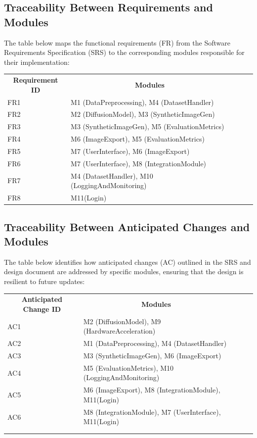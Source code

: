 \documentclass[12pt, titlepage]{article}
\begin{document}
\subsection{Traceability Between Requirements and Modules}
The table below maps the functional requirements (FR) from the Software Requirements Specification (SRS) to the corresponding modules responsible for their implementation:
\begin{table}[H]
  \begin{tabular}{lllll}
  \multicolumn{1}{c}{\textbf{Requirement ID}} & \multicolumn{1}{c}{\textbf{Modules}} &  &  &  \\
  FR1 & M1 (DataPreprocessing), M4 (DatasetHandler) &  &  &  \\
  FR2 & M2 (DiffusionModel), M3 (SyntheticImageGen) &  &  &  \\
  FR3 & M3 (SyntheticImageGen), M5 (EvaluationMetrics) &  &  &  \\
  FR4 & M6 (ImageExport), M5 (EvaluationMetrics) &  &  &  \\
  FR5 & M7 (UserInterface), M6 (ImageExport) &  &  &  \\
  FR6 & M7 (UserInterface), M8 (IntegrationModule) &  &  &  \\
  FR7 & M4 (DatasetHandler), M10 (LoggingAndMonitoring) &  &  &  \\
  FR8 & M11(Login) &  &  & 
  \end{tabular}
\end{table}

\subsection{Traceability Between Anticipated Changes and Modules}
The table below identifies how anticipated changes (AC) outlined in the SRS and design document are addressed by specific modules, ensuring that the design is resilient to future updates:

\begin{table}[H]
  \begin{tabular}{lllll}
  \multicolumn{1}{c}{\textbf{Anticipated Change ID}} & \multicolumn{1}{c}{\textbf{Modules}} &  &  &  \\
  AC1 & M2 (DiffusionModel), M9 (HardwareAcceleration) &  &  &  \\
  AC2 & M1 (DataPreprocessing), M4 (DatasetHandler) &  &  &  \\
  AC3 & M3 (SyntheticImageGen), M6 (ImageExport) &  &  &  \\
  AC4 & M5 (EvaluationMetrics), M10 (LoggingAndMonitoring) &  &  &  \\
  AC5 & M6 (ImageExport), M8 (IntegrationModule), M11(Login) &  &  &  \\
  AC6 & M8 (IntegrationModule), M7 (UserInterface), M11(Login) &  &  &  \\
   &  &  &  &  \\
   &  &  &  & 
  \end{tabular}
  \end{table}
\end{document}
